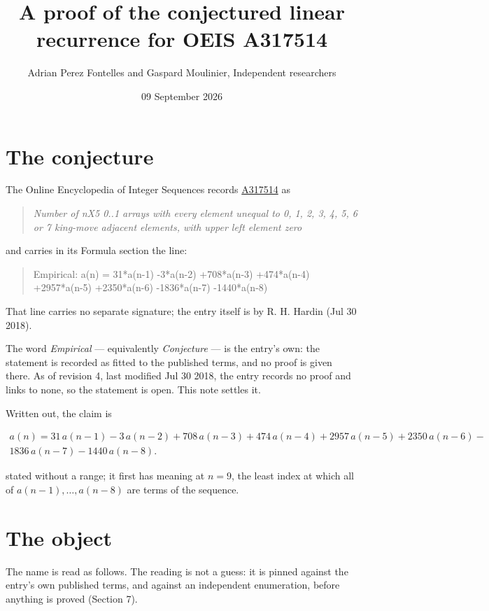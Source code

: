 \documentclass[11pt]{article}
\title{A proof of the conjectured linear recurrence for OEIS A317514}
\author{Adrian Perez Fontelles and Gaspard Moulinier, Independent researchers}
\date{09 September 2026}
\theoremstyle{definition}
\begin{document}
\maketitle
\section{The conjecture}

The Online Encyclopedia of Integer Sequences records \href{https://oeis.org/A317514}{A317514} as

\begin{quote}\itshape Number of nX5 0..1 arrays with every element unequal to 0, 1, 2, 3, 4, 5, 6 or 7 king-move adjacent elements, with upper left element zero\end{quote}

and carries in its Formula section the line:

\begin{quote}\ttfamily Empirical: a(n) = 31*a(n-1) -3*a(n-2) +708*a(n-3) +474*a(n-4) +2957*a(n-5) +2350*a(n-6) -1836*a(n-7) -1440*a(n-8)\end{quote}

That line carries no separate signature; the entry itself is by R. H. Hardin (Jul 30 2018).

The word {\itshape Empirical} --- equivalently {\itshape Conjecture} --- is the entry's own: the statement is recorded as fitted to the published terms, and no proof is given there. As of revision 4, last modified Jul 30 2018, the entry records no proof and links to none, so the statement is open. This note settles it.

Written out, the claim is

\begin{multline*} a(n) = 31\,a(n-1) - 3\,a(n-2) + 708\,a(n-3) + 474\,a(n-4) + 2957\,a(n-5) + 2350\,a(n-6) - \\ 1836\,a(n-7) - 1440\,a(n-8). \end{multline*}

stated without a range; it first has meaning at $n = 9$, the least index at which all of $a(n-1),\dots,a(n-8)$ are terms of the sequence.

\section{The object}

The name is read as follows. The reading is not a guess: it is pinned against the entry's own published terms, and against an independent enumeration, before anything is proved (Section 7).
\end{document}
